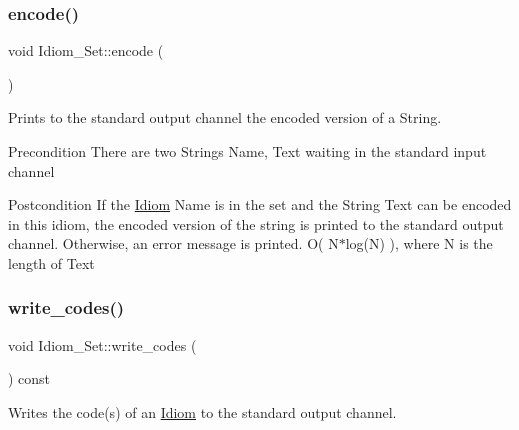 \subsubsection{\texorpdfstring{encode()}{encode()}}
{\footnotesize\ttfamily void Idiom\+\_\+\+Set\+::encode (\begin{DoxyParamCaption}{ }\end{DoxyParamCaption})}



Prints to the standard output channel the encoded version of a String. 

\begin{DoxyPrecond}{Precondition}
There are two Strings Name, Text waiting in the standard input channel 
\end{DoxyPrecond}
\begin{DoxyPostcond}{Postcondition}
If the \hyperlink{classIdiom}{Idiom} Name is in the set and the String Text can be encoded in this idiom, the encoded version of the string is printed to the standard output channel. Otherwise, an error message is printed.  O( N$\ast$log(\+N) ), where N is the length of Text 
\end{DoxyPostcond}
\mbox{\label{classIdiom__Set_a0240ca475c95b258678434dc14dc9c87}} 
\subsubsection{\texorpdfstring{write\+\_\+codes()}{write\_codes()}}
{\footnotesize\ttfamily void Idiom\+\_\+\+Set\+::write\+\_\+codes (\begin{DoxyParamCaption}{ }\end{DoxyParamCaption}) const}



Writes the code(s) of an \hyperlink{classIdiom}{Idiom} to the standard output channel. 

